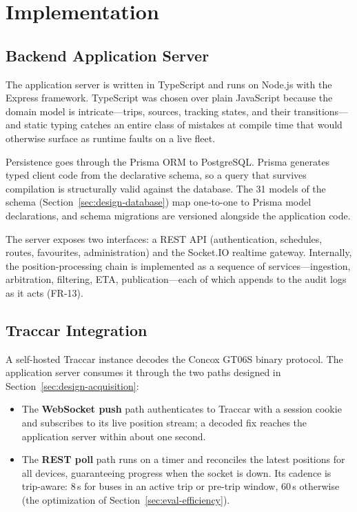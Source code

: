 \chapter{Implementation}
\label{ch:implementation}

\section{Backend Application Server}
\label{sec:impl-server}
The application server is written in TypeScript and runs on Node.js with
the Express framework. TypeScript was chosen over plain JavaScript
because the domain model is intricate---trips, sources, tracking states,
and their transitions---and static typing catches an entire class of
mistakes at compile time that would otherwise surface as runtime faults
on a live fleet.

Persistence goes through the Prisma ORM to PostgreSQL. Prisma generates
typed client code from the declarative schema, so a query that survives
compilation is structurally valid against the database. The 31 models of
the schema (Section~\ref{sec:design-database}) map one-to-one to Prisma
model declarations, and schema migrations are versioned alongside the
application code.

The server exposes two interfaces: a REST API (authentication, schedules,
routes, favourites, administration) and the Socket.IO realtime gateway.
Internally, the position-processing chain is implemented as a sequence of
services---ingestion, arbitration, filtering, ETA, publication---each of
which appends to the audit logs as it acts (FR-13).

\section{Traccar Integration}
\label{sec:impl-traccar}
A self-hosted Traccar instance decodes the Concox GT06S binary protocol.
The application server consumes it through the two paths designed in
Section~\ref{sec:design-acquisition}:

\begin{itemize}
  \item The \textbf{WebSocket push} path authenticates to Traccar with a
  session cookie and subscribes to its live position stream; a decoded
  fix reaches the application server within about one second.
  \item The \textbf{REST poll} path runs on a timer and reconciles the
  latest positions for all devices, guaranteeing progress when the
  socket is down. Its cadence is trip-aware: 8\,s for buses in an active
  trip or pre-trip window, 60\,s otherwise (the optimization of
  Section~\ref{sec:eval-efficiency}).
\end{itemize}

